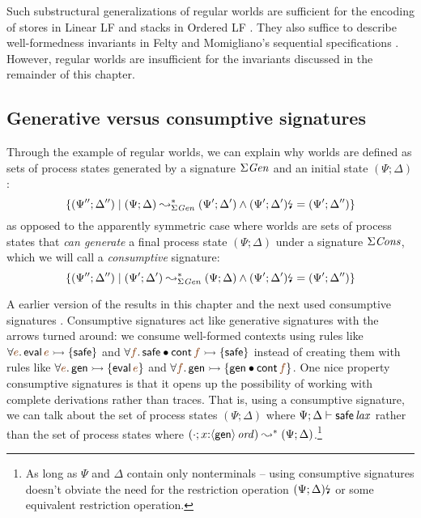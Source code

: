 Such substructural generalizations of regular worlds are sufficient
for the encoding of stores in Linear LF \cite{cervesato02linear} and
stacks in Ordered LF \cite{polakow01ordered}. They also suffice
to describe well-formedness invariants in Felty and Momigliano's
sequential specifications \cite{felty12hybrid}. However, regular
worlds are insufficient for the
invariants discussed in the remainder of this chapter.

\subsection{Generative versus consumptive signatures}

Through the example of regular worlds, we can explain why worlds are
defined as sets of process states generated by a signature
$\Sigma{\it Gen}$ and an initial state $(\Psi; \Delta)$:
\[ 
\{ (\Psi''; \Delta'') \mid
(\Psi; \Delta) \leadsto^*_{\Sigma{\it Gen}} (\Psi'; \Delta') \wedge
{(\Psi'; \Delta')}{\mbox{\lightning}}_{} = (\Psi'; \Delta'') \}
\]
as opposed to the apparently symmetric case where worlds
are sets of process states that {\it can generate} 
a final process state $(\Psi; \Delta)$ under a signature $\Sigma{\it Cons}$,
which we will call a {\it consumptive} signature:
\[ 
\{ (\Psi''; \Delta'') \mid
(\Psi'; \Delta') \leadsto^*_{\Sigma{\it Gen}} (\Psi; \Delta) \wedge
{(\Psi'; \Delta')}{\mbox{\lightning}}_{} = (\Psi'; \Delta'') \}
\]

A earlier version of the results in this chapter and
the next used consumptive signatures
\cite{simmons10type}. Consumptive signatures act like generative
signatures with the arrows turned around: we consume well-formed
contexts using rules like $\forall\lf{e}.\,{\sf
  eval}\,\lf{e} \lefti \{ {\sf safe} \}$ and $\forall \lf{f}.\,{\sf
  safe} \fuse {\sf cont}\,\lf{f} \lefti \{ {\sf safe} \}$ instead of
creating them with 
rules like $\forall\lf{e}.\,{\sf gen}\lefti \{ {\sf eval}\,\lf{e} \}$
and $\forall \lf{f}.\,{\sf gen} \lefti \{ {\sf gen} \fuse {\sf
  cont}\,\lf{f} \}$. 
One nice property consumptive signatures is that it opens up the
possibility of working with complete derivations 
rather than traces. That is, using a
consumptive signature, we can talk about the set of process states
$(\Psi; \Delta)$ where $\Psi; \Delta \vdash {{\sf safe}}\,{{\it lax}}$ rather
than the set of process states where $(\cdot; x{:}{\langle {\sf
    gen} \rangle}\,{{\it ord}}) \leadsto^* (\Psi; \Delta)$.\footnote{As long as $\Psi$ and
  $\Delta$ contain only nonterminals -- using consumptive signatures
  doesn't obviate the need for the restriction operation
  ${(\Psi; \Delta)}{\mbox{\lightning}}_{}$ or some equivalent restriction
  operation.} 

